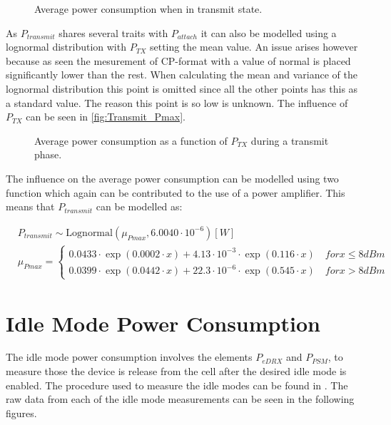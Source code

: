 \begin{figure}[H]
\centering
\begin{minipage}{0.48\textwidth}
\resizebox{\textwidth}{!}{
}
\end{minipage}
\hfill
\begin{minipage}{0.48\textwidth}
\resizebox{\textwidth}{!}{
}
\end{minipage}
\caption{Average power consumption when in transmit state.}
\label{fig:Transmit_Points}
\end{figure}

As $P_{transmit}$ shares several traits with $P_{attach}$ it can also be modelled using a lognormal distribution with $P_{TX}$ setting the mean value. An issue arises however because as seen the mesurement of CP-format with a value of normal is placed significantly lower than the rest. When calculating the mean and variance of the lognormal distribution this point is omitted since all the other points has this as a standard value. The reason this point is so low is unknown. The influence of $P_{TX}$ can be seen in \autoref{fig:Transmit_Pmax}. 

\begin{figure}[H]
\centering
{}
\resizebox{0.7\textwidth}{!}{
}
\caption{Average power consumption as a function of $P_{TX}$ during a transmit phase.}
\label{fig:Transmit_Pmax}
\end{figure}

The influence on the average power consumption can be modelled using two function which again can be contributed to the use of a power amplifier. This means that $P_{transmit}$ can be modelled as:

\begin{align}
&P_{transmit} \sim \text{Lognormal}(\mu_{Pmax},6.0040\cdot 10^{-6}) [W]\\ \nonumber
&\mu_{Pmax} = \begin{cases} 0.0433\cdot\exp{(0.0002\cdot x)} + 4.13\cdot10^{-3}\cdot\exp{(0.116\cdot x)} \quad for x \leq 8 dBm \\
0.0399\cdot\exp{(0.0442\cdot x)} + 22.3\cdot10^{-6}\cdot\exp{(0.545\cdot x)} \quad for x > 8 dBm \end{cases}
\end{align}


\section{Idle Mode Power Consumption}
The idle mode power consumption involves the elements $P_{eDRX}$ and $P_{PSM}$, to measure those the device is release from the cell after the desired idle mode is enabled. The procedure used to measure the idle modes can be found in . The raw data from each of the idle mode measurements can be seen in the following figures.


